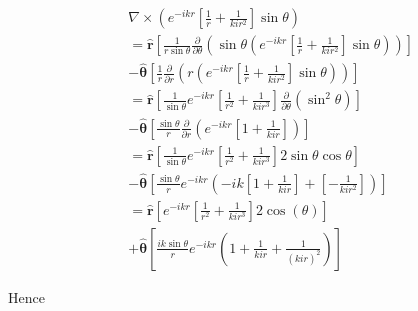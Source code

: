 \documentclass[a4paper,14pt]{extbook}
\begin{document}
\begin{eqnarray}
&&\nabla \times \left( e^{-ikr } \left[  \frac{ 1}{ r}+ \frac{1}{kir^2}\right] \sin \theta \right)\nonumber \\
&&=\mathbf{\hat{r} }\left[ \frac{1}{r \sin \theta} \frac{\partial }{\partial \theta } \left( \sin \theta \left( e^{-ikr } \left[  \frac{ 1}{ r} +\frac{1}{kir^2}\right] \sin \theta \right) \right) \right] \nonumber \\
&&-\mathbf{ \hat{\theta}} \left[ \frac{1}{r} \frac{\partial }{\partial r } \left( r \left( e^{-ikr } \left[  \frac{ 1}{ r}+ \frac{1}{kir^2}\right] \sin \theta \right) \right) \right]\nonumber \\
&&=\mathbf{\hat{r}} \left[ \frac{1}{ \sin \theta} e^{-ikr } \left[  \frac{ 1}{ r^2} +\frac{1}{kir^3}\right] \frac{\partial }{\partial \theta } \left( \sin^2 \theta     \right) \right] \nonumber \\
&&-\mathbf{ \hat{\theta}} \left[ \frac{\sin \theta}{r} \frac{\partial }{\partial r } \left(   e^{-ikr } \left[  1 + \frac{1}{kir}\right]  \right) \right]\nonumber\\
&&=\mathbf{\hat{r}} \left[ \frac{1}{ \sin \theta} e^{-ikr } \left[  \frac{ 1}{ r^2} +\frac{1}{kir^3}\right]  2 \sin \theta \cos \theta     \right] \nonumber \\
&&- \mathbf{\hat{\theta}} \left[ \frac{\sin \theta}{r}  e^{-ikr } \left(  -ik   \left[  1 + \frac{1}{kir}\right]+   \left[ - \frac{1}{kir^2}\right] \right) \right] \nonumber \\
&&=\mathbf{\hat{r} }\left[ e^{-ikr } \left[  \frac{ 1}{ r^2} +\frac{1}{kir^3}\right]   2  \cos (\theta )   \right] \nonumber \\
&&+\mathbf{ \hat{\theta}} \left[ \frac{ik \sin \theta}{r}  e^{-ikr } \left( 1 + \frac{1}{kir}+  \frac{1}{(kir)^2} \right) \right]
\end{eqnarray}

Hence
\end{document}
